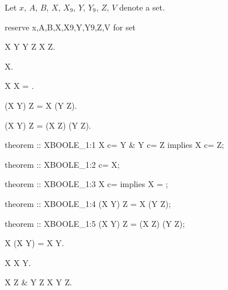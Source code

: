 \begin{paracol}{2}
Let $x$, $A$, $B$, $X$, $X_{9}$, $Y$, $Y_{9}$, $Z$, $V$ denote a set.

\switchcolumn

\begin{mizar}
reserve x,A,B,X,X9,Y,Y9,Z,V for set
\end{mizar}

\switchcolumn*\ensurevspace{5cm}

\begin{theorem}
  X \subset Y \land Y \subset Z \implies X \subset Z.
\end{theorem}

\begin{theorem}
  \emptyset \subset X.
\end{theorem}

\begin{theorem}
  X \subset \emptyset \implies X = \emptyset.
\end{theorem}

\begin{theorem}
  (X \cup Y) \cup Z = X \cup (Y \cup Z).
\end{theorem}

\begin{theorem}
  (X \cup Y) \cup Z = (X \cup Z) \cup (Y \cup Z).
\end{theorem}

\switchcolumn

\begin{mizar}
theorem :: XBOOLE_1:1
  X c= Y & Y c= Z implies X c= Z;

theorem :: XBOOLE_1:2
  {} c= X;

theorem :: XBOOLE_1:3
  X c= {} implies X = {};

theorem :: XBOOLE_1:4
  (X \/ Y) \/ Z = X \/ (Y \/ Z);

theorem :: XBOOLE_1:5
  (X \/ Y) \/ Z = (X \/ Z) \/ (Y \/ Z);
\end{mizar}

\switchcolumn*\ensurevspace{5cm}

\begin{theorem}
  X \cup (X \cup Y) = X \cup Y.
\end{theorem}

\begin{theorem}
  X \subset X \cup Y.
\end{theorem}

\begin{theorem}
  X \subset Z \& Y \subset Z \implies X \cup Y \subset Z.
\end{theorem}


\end{paracol}
